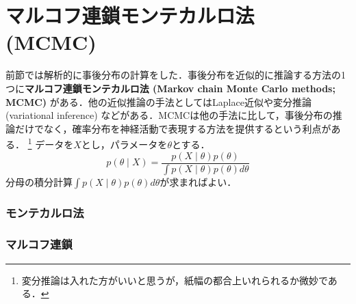 \section{マルコフ連鎖モンテカルロ法 (MCMC)}前節では解析的に事後分布の計算をした．事後分布を近似的に推論する方法の1つに\textbf{マルコフ連鎖モンテカルロ法 (Markov chain Monte Carlo methods; MCMC)} がある．他の近似推論の手法としてはLaplace近似や変分推論 (variational inference) などがある．MCMCは他の手法に比して，事後分布の推論だけでなく，確率分布を神経活動で表現する方法を提供するという利点がある．
\footnote{
変分推論は入れた方がいいと思うが，紙幅の都合上いれられるか微妙である．
}
データを$X$とし，パラメータを$\theta$とする．
$$
p(\theta\mid X)=\frac{p(X\mid \theta)p(\theta)}{\int p(X\mid \theta)p(\theta)d\theta}
$$
分母の積分計算$\int p(X\mid \theta)p(\theta)d\theta$が求まればよい．
\subsubsection{モンテカルロ法}\subsubsection{マルコフ連鎖}